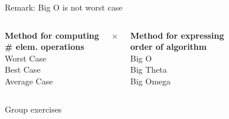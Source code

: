 \documentclass[10pt]{beamer}
\begin{document}
\begin{frame}{Remark: Big O is not worst case}

\begin{columns}[c]
    \centering
    \textbf{Method for computing} \\
    \textbf{\# elem. operations} \\
    Worst Case \\
   	Best Case  \\
	Average Case

    \centering
	{\Huge $\times$}
    
    \centering
    \textbf{Method for expressing} \\
    \textbf{order of algorithm} \\
    Big O \\
   	Big Theta  \\
	Big Omega

\end{columns}
	
\end{frame}


\begin{frame}[standout]
Group exercises
\end{frame}
\end{document}
